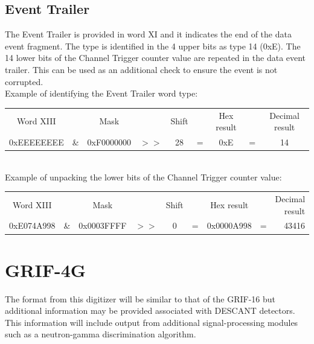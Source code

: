 \documentclass[letterpaper,12pt,notitlepage]{report}
\begin{document}
\subsection{Event Trailer}
The Event Trailer is provided in word XI and it indicates the end of the data event fragment. The type is identified in the 4 upper bits as type 14 (0xE). The 14 lower bits of the Channel Trigger counter value are repeated in the data event trailer. This can be used as an additional check to ensure the event is not corrupted.\\

Example of identifying the Event Trailer word type:\\

\begin{tabular}{ccccccccc}
Word XIII &  & Mask & & Shift & & Hex result & & Decimal result\\
0xEEEEEEEE & \& & 0xF0000000 & $>>$ & 28 & = & 0xE & = & 14\\
\end{tabular}\\

Example of unpacking the lower bits of the Channel Trigger counter value:\\
\begin{tabular}{ccccccccr}
Word XIII &  & Mask & & Shift & & Hex result & & Decimal result\\
0xE074A998 & \& & 0x0003FFFF & $>>$ & 0 & = & 0x0000A998 & = & 43416\\
\end{tabular}


\section{GRIF-4G}


The format from this digitizer will be similar to that of the GRIF-16 but additional information may be provided associated with DESCANT detectors. This information will include output from additional signal-processing modules such as a neutron-gamma discrimination algorithm.\\

\newpage
\end{document}
